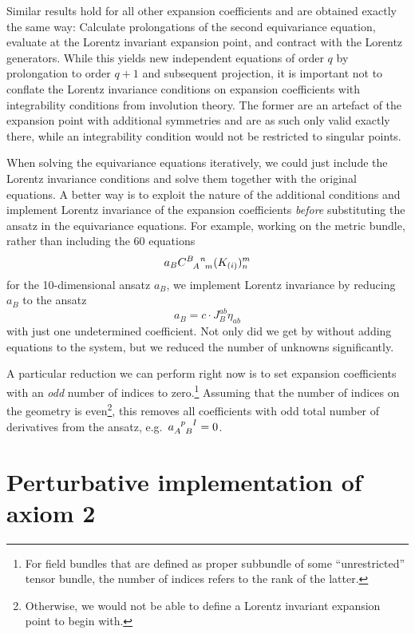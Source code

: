 Similar results hold for all other expansion coefficients and are obtained exactly the same way: Calculate prolongations of the second equivariance equation, evaluate at the Lorentz invariant expansion point, and contract with the Lorentz generators. While this yields new independent equations of order $q$ by prolongation to order $q+1$ and subsequent projection, it is important not to conflate the Lorentz invariance conditions on expansion coefficients with integrability conditions from involution theory. The former are an artefact of the expansion point with additional symmetries and are as such only valid exactly there, while an integrability condition would not be restricted to singular points.

When solving the equivariance equations iteratively, we could just include the Lorentz invariance conditions and solve them together with the original equations. A better way is to exploit the nature of the additional conditions and implement Lorentz invariance of the expansion coefficients \emph{before} substituting the ansatz in the equivariance equations. For example, working on the metric bundle, rather than including the 60 equations
\begin{equation}
  a_B \gmc{B}{A}{n}{m}(K_{(i)})^m_n
\end{equation}
for the 10-dimensional ansatz $a_B$, we implement Lorentz invariance by reducing $a_B$ to the ansatz
\begin{equation}
  a_B = c\cdot J_B^{ab} \eta_{ab}
\end{equation}
with just one undetermined coefficient. Not only did we get by without adding equations to the system, but we reduced the number of unknowns significantly.

A particular reduction we can perform right now is to set expansion coefficients with an \emph{odd} number of indices to zero.\footnote{For field bundles that are defined as proper subbundle of some ``unrestricted'' tensor bundle, the number of indices refers to the rank of the latter.} Assuming that the number of indices on the geometry is even\footnote{Otherwise, we would not be able to define a Lorentz invariant expansion point to begin with.}, this removes all coefficients with odd total number of derivatives from the ansatz, e.g.~$a_{A\hphantom pB}^{\hphantom Ap\hphantom BI}=0$.

\section{Perturbative implementation of axiom 2}\label{section_axiom2_perturb}

